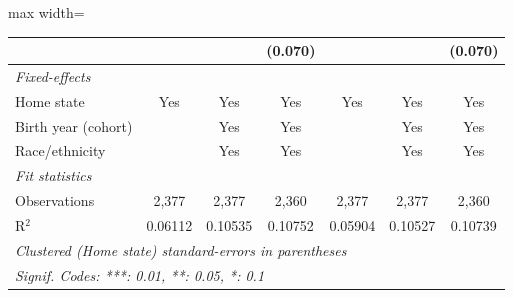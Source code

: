 \begin{adjustbox}{max width=\linewidth}
\begin{tabular}{lcccccc}
                                                         &               &               & (0.070)      &               &               & (0.070)\\   
      \midrule
      \emph{Fixed-effects}\\
      Home state                                         & Yes           & Yes           & Yes          & Yes           & Yes           & Yes\\  
      Birth year (cohort)                                &               & Yes           & Yes          &               & Yes           & Yes\\  
      Race/ethnicity                                     &               & Yes           & Yes          &               & Yes           & Yes\\  
      \midrule
      \emph{Fit statistics}\\
      Observations                                       & 2,377         & 2,377         & 2,360        & 2,377         & 2,377         & 2,360\\  
      R$^2$                                              & 0.06112       & 0.10535       & 0.10752      & 0.05904       & 0.10527       & 0.10739\\  
      \midrule \midrule
      \multicolumn{7}{l}{\emph{Clustered (Home state) standard-errors in parentheses}}\\
      \multicolumn{7}{l}{\emph{Signif. Codes: ***: 0.01, **: 0.05, *: 0.1}}\\
   \end{tabular}
      \end{adjustbox}
\vspace{3pt}\par{}
